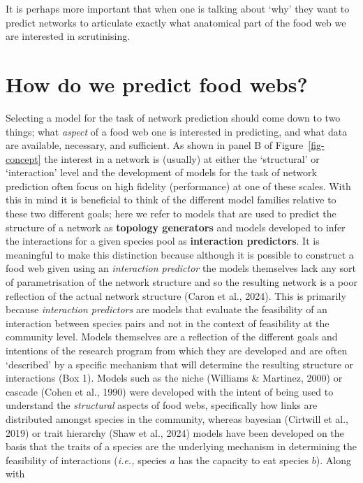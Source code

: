 \documentclass[
]{article}
\begin{document}
It is perhaps more important that when one is talking about `why' they
want to predict networks to articulate exactly what anatomical part of
the food web we are interested in scrutinising.

\section{How do we predict food webs?}\label{sec-network-build}

Selecting a model for the task of network prediction should come down to
two things; what \emph{aspect} of a food web one is interested in
predicting, and what data are available, necessary, and sufficient. As
shown in panel B of Figure~\ref{fig-concept} the interest in a network
is (usually) at either the `structural' or `interaction' level and the
development of models for the task of network prediction often focus on
high fidelity (performance) at one of these scales. With this in mind it
is beneficial to think of the different model families relative to these
two different goals; here we refer to models that are used to predict
the structure of a network as \textbf{topology generators} and models
developed to infer the interactions for a given species pool as
\textbf{interaction predictors}. It is meaningful to make this
distinction because although it is possible to construct a food web
given using an \emph{interaction predictor} the models themselves lack
any sort of parametrisation of the network structure and so the
resulting network is a poor reflection of the actual network structure
(Caron et al., 2024). This is primarily because \emph{interaction
predictors} are models that evaluate the feasibility of an interaction
between species pairs and not in the context of feasibility at the
community level. Models themselves are a reflection of the different
goals and intentions of the research program from which they are
developed and are often `described' by a specific mechanism that will
determine the resulting structure or interactions (Box 1). Models such
as the niche (Williams \& Martinez, 2000) or cascade (Cohen et al.,
1990) were developed with the intent of being used to understand the
\emph{structural} aspects of food webs, specifically how links are
distributed amongst species in the community, whereas bayesian (Cirtwill
et al., 2019) or trait hierarchy (Shaw et al., 2024) models have been
developed on the basis that the traits of a species are the underlying
mechanism in determining the feasibility of interactions (\emph{i.e.,}
species \(a\) has the capacity to eat species \(b\)). Along with
\end{document}
